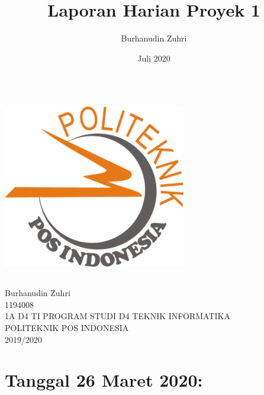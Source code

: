 \documentclass{article}
\title{Laporan Harian Proyek 1}
\author{Burhanudin Zuhri}
\date{Juli 2020}
\begin{document}
\maketitle
	\begin{center}
		\includegraphics[width=8cm,height=8cm]{logo.png}
	\end{center}
	\vspace{0.5 cm}
	
	\begin{center}
		Burhanudin Zuhri \\
		1194008 \\
		1A D4 TI \linebreak
		\newline
		\newline
		\newline
		\linebreak
		\newline
		\newline
		PROGRAM STUDI D4 TEKNIK INFORMATIKA \\
		POLITEKNIK POS INDONESIA\\
		2019/2020\\
	\end{center}

\section{Tanggal 26 Maret 2020:}
\end{document}
